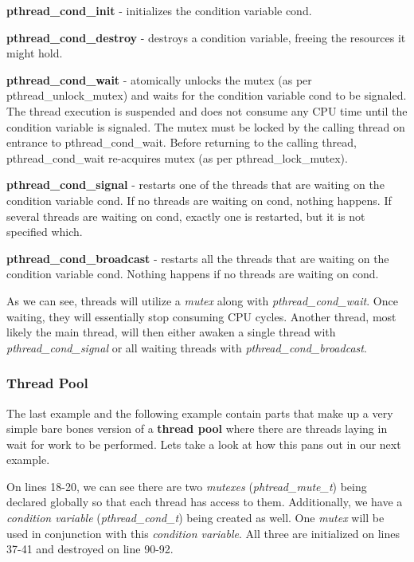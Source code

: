 \documentclass[../main.tex]{subfiles}
\begin{document}
	\textbf{pthread\_cond\_init} - initializes the condition variable cond.
		
	\textbf{pthread\_cond\_destroy} - destroys a condition variable, freeing the resources it might hold.
		
	\textbf{pthread\_cond\_wait} - atomically unlocks the mutex (as per pthread\_unlock\_mutex) and waits for the condition variable cond to be signaled. The thread execution is suspended and does not consume any  CPU	time  until the condition variable is signaled. The mutex must be locked by the calling thread on entrance to pthread\_cond\_wait. Before returning to the calling thread, pthread\_cond\_wait re-acquires mutex (as per pthread\_lock\_mutex).
		
	\textbf{pthread\_cond\_signal} - restarts  one of the threads that are waiting on the condition variable cond. If no threads are waiting on cond, nothing happens. If several threads are waiting on cond, exactly one is restarted, but it is not specified which.
		
	\textbf{pthread\_cond\_broadcast} - restarts all the threads that are waiting on the condition variable cond. Nothing happens if no threads are waiting on cond.

	As we can see, threads will utilize a \textit{mutex} along with \textit{pthread\_cond\_wait}.  Once waiting, they will essentially stop consuming CPU cycles.  Another thread, most likely the main thread, will then either awaken a single thread with \textit{pthread\_cond\_signal} or all waiting threads with \textit{pthread\_cond\_broadcast}.
	
	\subsubsection{Thread Pool}
	The last example and the following example contain parts that make up a very simple bare bones version of a \textbf{thread pool} where there are threads laying in wait for work to be performed.  Lets take a look at how this pans out in our next example. \\
	
	
	On lines 18-20, we can see there are two \textit{mutexes} (\textit{phtread\_mute\_t}) being declared globally so that each thread has access to them.  Additionally, we have a \textit{condition variable} (\textit{pthread\_cond\_t}) being created as well.  One \textit{mutex} will be used in conjunction with this \textit{condition variable}. All three are initialized on lines 37-41 and destroyed on line 90-92.
	
\end{document}
